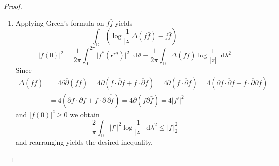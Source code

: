 \documentclass[letterpaper, 11pt]{article}
\newcommand{\D}{\mathbb{D}}
\newcommand{\1}{\mathds{1}}
\newcommand{\diff}{\mathop{}\!\mathrm{d}}
\newcommand{\wirtzbar}{\overline{\partial}}
\theoremstyle{definition}
\begin{document}
\begin{proof} {\ }
  \begin{enumerate}
    \item Applying Green's formula on $f \bar{f}$ yields
    $$ \int_\D (\log \frac{1}{\vert z \vert} \Delta (f \bar{f}) - f \bar{f}) $$
    $$ \vert f(0) \vert^2 = \frac{1}{2 \pi} \int_0^{2 \pi} \vert f^*(e^{i \vartheta}) \vert^2 \diff \vartheta - \frac{1}{2 \pi} \int_\D \Delta(f \bar{f}) \log \frac{1}{\vert z \vert} \diff \lambda^2 $$
    Since
    \begin{align*}
      \Delta(f \bar{f}) &= 4 \partial \wirtzbar (f \bar{f}) = 4 \partial ( \bar{f} \cdot \wirtzbar f + f \cdot \wirtzbar \bar{f} ) = 4 \partial (f \cdot \wirtzbar \bar{f}) = 4 (\partial f \cdot \wirtzbar \bar{f} + f \cdot \wirtzbar \partial \bar{f}) = \\
      &= 4 (\partial f \cdot \overline{\partial f} + f \cdot \wirtzbar \,\overline{ \wirtzbar f }) = 4 \partial ( f \wirtzbar \bar{f} ) = 4 \vert f' \vert^2
    \end{align*}
    and $ \vert f(0) \vert^2 \geq 0$ we obtain
    $$ \frac{2}{\pi} \int_\D \vert f' \vert^2  \log \frac{1}{\vert z \vert} \diff \lambda^2 \leq \Vert f \Vert_2^2 $$
    and rearranging yields the desired inequality.
  \end{enumerate}
\end{proof}
\end{document}
